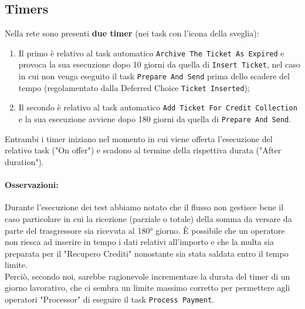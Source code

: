 \documentclass[../Relazione.tex]{subfiles}
\begin{document}
    \subsection{Timers} Nella rete sono presenti \textbf{due timer} (nei task con l'icona della sveglia):
    \begin{enumerate}
        \item Il primo è relativo al task automatico \texttt{Archive The Ticket As Expired} e provoca la sua esecuzione dopo 10 giorni da quella di \texttt{Insert Ticket}, nel caso in cui non venga eseguito il task \texttt{Prepare And Send} prima dello scadere del tempo (regolamentato dalla Deferred Choice \texttt{Ticket Inserted});
        \item Il secondo è relativo al task automatico \texttt{Add Ticket For Credit Collection} e la sua esecuzione avviene dopo 180 giorni da quella di \texttt{Prepare And Send}.
    \end{enumerate}
    Entrambi i timer iniziano nel momento in cui viene offerta l'esecuzione del relativo task ("On offer") e scadono al termine della rispettiva durata ("After duration").
    \paragraph*{Osservazioni:} Durante l'esecuzione dei test abbiamo notato che il flusso non gestisce bene il caso particolare in cui la ricezione (parziale o totale) della somma da versare da parte del trasgressore sia ricevuta al \ang{180} giorno. È possibile che un operatore non riesca ad inserire in tempo i dati relativi all'importo e che la multa sia preparata per il "Recupero Crediti" nonostante sia stata saldata entro il tempo limite.\\
    Perciò, secondo noi, sarebbe ragionevole incrementare la durata del timer di un giorno lavorativo, che ci sembra un limite massimo corretto per permettere agli operatori "Processor" di eseguire il task \texttt{Process Payment}.
    
\end{document}

